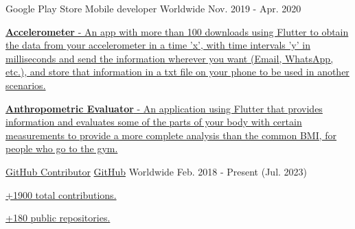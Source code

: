 \begin{cventries}
  \cventry
  {Google Play Store} %
  {Mobile developer} %
  {Worldwide} %
  {Nov. 2019 - Apr. 2020} %
  {
    \begin{cvitems} %
      \item {\href{https://play.google.com/store/apps/details?id=com.grisu.accelerometer}{
                    \textbf{Accelerometer} - An app with more than 100 downloads using Flutter to obtain the data from your accelerometer
                    in a time 'x', with time intervals 'y' in milliseconds and send the information wherever you
                    want (Email, WhatsApp, etc.), and store that information in a txt file on your phone to be
                    used in another scenarios.}}
      \item {\href{https://play.google.com/store/apps/details?id=com.grisu.anthropometric_evaluator}{
                    \textbf{Anthropometric Evaluator} - An application using Flutter that provides information
                    and evaluates some of the parts of your body with certain measurements to provide a more
                    complete analysis than the common BMI, for people who go to the gym.}}
    \end{cvitems}
  }

  \cventry
  {\href{https://github.com/Youngermaster}{GitHub Contributor}} %
  {\href{https://github.com/Youngermaster}{GitHub}} %
  {Worldwide} %
  {Feb. 2018 - Present (Jul. 2023)} %
  {
    \begin{cvitems} %
      \item {\href{https://github.com/Youngermaster}{+1900 total contributions.}}
      \item {\href{https://github.com/Youngermaster}{+180 public repositories.}}
    \end{cvitems}
  }

\end{cventries}
